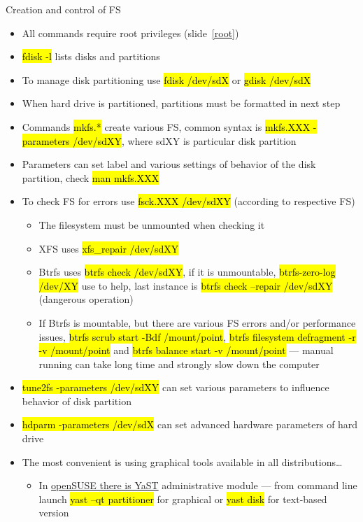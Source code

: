 \documentclass[compress, ucs, xelatex, 11pt, xcolor=svgnames,
  hyperref={
    bookmarks=true,
    unicode=true,
    colorlinks=true,
    pdftitle={Linux, command line and MetaCentrum},
    plainpages=false,
    pdfauthor={Vojtech Zeisek},
    pdfsubject={Course about use of Linux command line, writing shell scripts and using MetaCentrum of CESNET},
    pdfcreator={XeLaTeX},
    pdfkeywords={Linux, GNU, BASH, shell, command line, MetaCentrum},
    linkcolor=DarkRed,
    anchorcolor=DarkBlue,
    citecolor=Indigo,
    filecolor=NavyBlue,
    menucolor=DarkMagenta,
    urlcolor=DarkBlue,
    pdftex},
  url={hyphens, lowtilde} %
  ]{beamer}
\renewcommand{\texttt}[1]{\hl{\ttfamily #1}}
\begin{document}
\begin{frame}[allowframebreaks]{Creation and control of FS}
  \begin{itemize}
    \item All commands require root privileges (slide~\ref{root})
    \item \texttt{fdisk -l} lists disks and partitions
    \item To manage disk partitioning use \texttt{fdisk /dev/sdX} or \texttt{gdisk /dev/sdX}
    \item When hard drive is partitioned, partitions must be formatted in next step
    \item Commands \texttt{mkfs.*} create various FS, common syntax is \texttt{mkfs.XXX -parameters /dev/sdXY}, where sdXY is particular disk partition
    \item Parameters can set label and various settings of behavior of the disk partition, check \texttt{man mkfs.XXX}
    \item To check FS for errors use \texttt{fsck.XXX /dev/sdXY} (according to respective FS)
    \begin{itemize}
      \item The filesystem must be unmounted when checking it
      \item XFS uses \texttt{xfs\_repair /dev/sdXY}
      \item Btrfs uses \texttt{btrfs check /dev/sdXY}, if it is unmountable, \texttt{btrfs-zero-log /dev/XY} use to help, last instance is \texttt{btrfs check --repair /dev/sdXY} (dangerous operation)
      \item If Btrfs is mountable, but there are various FS errors and/or performance issues, \texttt{btrfs scrub start -Bdf /mount/point}, \texttt{btrfs filesystem defragment -r -v /mount/point} and \texttt{btrfs balance start -v /mount/point} --- manual running can take long time and strongly slow down the computer
    \end{itemize}
    \item \texttt{tune2fs -parameters /dev/sdXY} can set various parameters to influence behavior of disk partition
    \item \texttt{hdparm -parameters /dev/sdX} can set advanced hardware parameters of hard drive
    \item The most convenient is using graphical tools available in all distributions\ldots
    \begin{itemize}
      \item In \href{https://doc.opensuse.org/documentation/leap/reference/html/book.opensuse.reference/cha.advdisk.html}{openSUSE there is YaST} administrative module --- from command line launch \texttt{yast --qt partitioner} for graphical or \texttt{yast disk} for text-based version

\end{itemize}
\end{itemize}
\end{frame}
\end{document}
